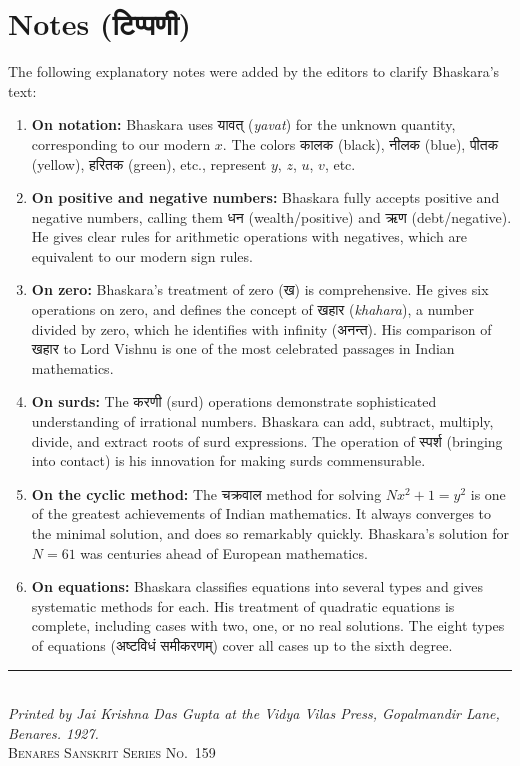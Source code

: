 \documentclass[11pt,a4paper]{article}
\newcommand{\dev}[1]{{\devanagarifont #1}}
\newcommand{\longline}{\noindent\rule{\textwidth}{0.4pt}}
\begin{document}
\vspace{1cm}

\section*{Notes (\dev{टिप्पणी})}

The following explanatory notes were added by the editors to clarify Bhaskara's text:

\vspace{0.3cm}

\begin{enumerate}[leftmargin=2em]
  \item \textbf{On notation:} Bhaskara uses \dev{यावत्} (\textit{yavat}) for the unknown quantity, corresponding to our modern $x$. The colors \dev{कालक} (black), \dev{नीलक} (blue), \dev{पीतक} (yellow), \dev{हरितक} (green), etc., represent $y$, $z$, $u$, $v$, etc.

  \item \textbf{On positive and negative numbers:} Bhaskara fully accepts positive and negative numbers, calling them \dev{धन} (wealth/positive) and \dev{ऋण} (debt/negative). He gives clear rules for arithmetic operations with negatives, which are equivalent to our modern sign rules.

  \item \textbf{On zero:} Bhaskara's treatment of zero (\dev{ख}) is comprehensive. He gives six operations on zero, and defines the concept of \dev{खहार} (\textit{khahara}), a number divided by zero, which he identifies with infinity (\dev{अनन्त}). His comparison of \dev{खहार} to Lord Vishnu is one of the most celebrated passages in Indian mathematics.

  \item \textbf{On surds:} The \dev{करणी} (surd) operations demonstrate sophisticated understanding of irrational numbers. Bhaskara can add, subtract, multiply, divide, and extract roots of surd expressions. The operation of \dev{स्पर्श} (bringing into contact) is his innovation for making surds commensurable.

  \item \textbf{On the cyclic method:} The \dev{चक्रवाल} method for solving $Nx^2 + 1 = y^2$ is one of the greatest achievements of Indian mathematics. It always converges to the minimal solution, and does so remarkably quickly. Bhaskara's solution for $N = 61$ was centuries ahead of European mathematics.

  \item \textbf{On equations:} Bhaskara classifies equations into several types and gives systematic methods for each. His treatment of quadratic equations is complete, including cases with two, one, or no real solutions. The eight types of equations (\dev{अष्टविधं समीकरणम्}) cover all cases up to the sixth degree.
\end{enumerate}

\vspace{1cm}

\begin{center}
\longline\\[0.3cm]
{\small\textit{Printed by Jai Krishna Das Gupta at the Vidya Vilas Press, Gopalmandir Lane, Benares. 1927.}}\\[0.1cm]
{\small\textsc{Benares Sanskrit Series No.~159}}
\end{center}
\end{document}
